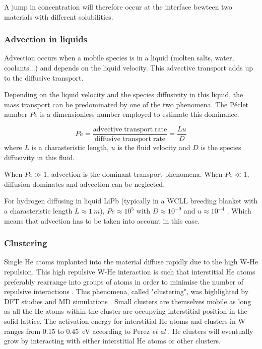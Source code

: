 A jump in concentration will therefore occur at the interface bewteen two materials with different solubilities.

\subsubsection{Advection in liquids}
Advection occurs when a mobile species is in a liquid (molten salts, water, coolants...) and depends on the liquid velocity.
This advective transport adds up to the diffusive transport.

Depending on the liquid velocity and the species diffusivity in this liquid, the mass transport can be predominated by one of the two phenomena.
The Péclet number $Pe$ is a dimensionless number employed to estimate this dominance.

\begin{equation}
    Pe = \frac{\mathrm{advective \; transport \; rate}}{\mathrm{diffusive \; transport \; rate}} = \frac{L u}{D}
\end{equation}
where $L$ is a charasteristic length, $u$ is the fluid velocity and $D$ is the species diffusivity in this fluid.

When $Pe \gg 1$, advection is the dominant transport phenomena.
When $Pe \ll 1$, diffusion dominates and advection can be neglected.

For hydrogen diffusing in liquid LiPb (typically in a WCLL breeding blanket with a charasteristic length $L \approx \SI{1}{m}$), $Pe \approx 10^{5}$ with $D \approx 10^{-9}$ and $u \approx 10 ^{-4}$ .
Which means that advection has to be taken into account in this case.

\subsubsection{Clustering}
Single He atoms implanted into the material diffuse rapidly due to the high W-He repulsion.
This high repulsive W-He interaction is such that interstitial He atoms preferably rearrange into groups of atoms in order to minimise the number of repulsive interactions .
This phenomena, called "clustering", was highlighted by DFT studies \cite{becquart_density_2009,dunn_rate_2013} and MD simulations \cite{henriksson_molecular_2006}.
Small clusters are themselves mobile as long as all the He atoms within the cluster are occupying interstitial position in the solid lattice.
The activation energy for interstitial He atoms and clusters in W ranges from 0.15 to \SI{0.45}{eV} according to Perez \textit{et al} .
He clusters will eventually grow by interacting with either interstitial He atoms or other clusters.

